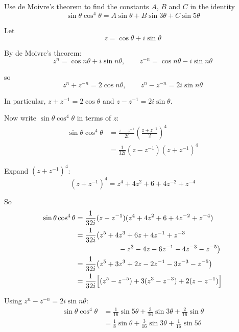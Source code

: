 \documentclass[leqno]{article}
\begin{document}
\djsFrontMatter
\begin{enumerate}[
  label=\textbf{\arabic*.},
  leftmargin=*,
  topsep=0pt,
  partopsep=0pt,
  parsep=0pt
]

\questionitem

Use de Moivre's theorem to find the constants $A$, $B$ and $C$ in the identity
\[
\sin\theta\cos^4\theta = A\sin\theta + B\sin 3\theta + C\sin 5\theta
\]

\vspace*{10pt}

\begin{djsSolution}
Let
\[
z=\cos\theta+i\sin\theta
\]

By de Moivre's theorem:
\[
z^n=\cos n\theta+i\sin n\theta,
\qquad
z^{-n}=\cos n\theta-i\sin n\theta
\]

so
\[
z^n+z^{-n}=2\cos n\theta,
\qquad
z^n-z^{-n}=2i\sin n\theta
\]

In particular, \(z+z^{-1}=2\cos\theta\) and \(z-z^{-1}=2i\sin\theta\).

Now write \(\sin\theta\cos^4\theta\) in terms of \(z\):
\begin{align*}
\sin\theta\cos^4\theta
&=\frac{z-z^{-1}}{2i}\left(\frac{z+z^{-1}}{2}\right)^4 \\
&=\frac{1}{32i}(z-z^{-1})(z+z^{-1})^4
\end{align*}

Expand \((z+z^{-1})^4\):
\[
(z+z^{-1})^4=z^4+4z^2+6+4z^{-2}+z^{-4}
\]

So
\begin{align*}
\sin\theta\cos^4\theta
&=\frac{1}{32i}(z-z^{-1})(z^4+4z^2+6+4z^{-2}+z^{-4}) \\
&=\frac{1}{32i}\bigl(z^5+4z^3+6z+4z^{-1}+z^{-3} \\
&\qquad\qquad\qquad {}-z^3-4z-6z^{-1}-4z^{-3}-z^{-5}\bigr) \\
&=\frac{1}{32i}\bigl(z^5+3z^3+2z-2z^{-1}-3z^{-3}-z^{-5}\bigr) \\
&=\frac{1}{32i}\Bigl[(z^5-z^{-5})+3(z^3-z^{-3})+2(z-z^{-1})\Bigr]
\end{align*}

Using \(z^n-z^{-n}=2i\sin n\theta\):
\begin{align*}
\sin\theta\cos^4\theta
&=\frac{1}{16}\sin5\theta+\frac{3}{16}\sin3\theta+\frac{2}{16}\sin\theta \\
&=\frac{1}{8}\sin\theta+\frac{3}{16}\sin3\theta+\frac{1}{16}\sin5\theta
\end{align*}


\end{djsSolution}
\end{enumerate}
\end{document}
